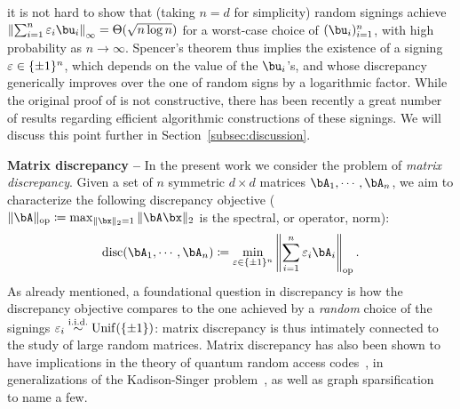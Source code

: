 it is not hard to show that (taking $n = d$ for simplicity) random signings achieve $\left\|\sum_{i=1}^n \eps_i \bu_i\right\|_\infty = \Theta(\sqrt{n \log n})$ for a worst-case choice of $(\bu_i)_{i=1}^n$, 
with high probability as $n \to \infty$. Spencer's theorem thus implies the existence of a signing $\varepsilon \in \{\pm 1\}^n$, 
which depends on the value of the $\bu_i$'s, and whose discrepancy generically improves over the one of random signs by a logarithmic factor.
While the original proof of \cite{spencer1985six} is not constructive, there has been recently a great number of results regarding efficient algorithmic constructions of 
these signings. We will discuss this point further in Section~\ref{subsec:discussion}.

\myskip 
\textbf{Matrix discrepancy --}
In the present work we consider the problem of \emph{matrix discrepancy}. Given a set of $n$ symmetric $d \times d$ matrices $\bA_1, \cdots, \bA_n$, 
we aim to characterize the following discrepancy objective ($\|\bA\|_\op \coloneqq \max_{\|\bx\|_2=1} \|\bA \bx\|_2$ is the spectral, or operator, norm):
\begin{equation}
    \label{eq:def_disc}
    \disc(\bA_1, \cdots, \bA_n) \coloneqq \min_{\eps \in \{\pm 1\}^n} \left\| \sum_{i=1}^n \eps_i \bA_i \right\|_\op.
\end{equation}
As already mentioned, a foundational question in discrepancy is how the discrepancy objective compares to the one achieved by a \emph{random} choice of the 
signings $\varepsilon_i \overset{\mathrm{i.i.d.}}{\sim} \mathrm{Unif}(\{\pm 1\})$: matrix discrepancy is thus intimately connected to the study of large random matrices.
Matrix discrepancy has also
been shown to have implications in the theory of quantum random access codes~\citep{hopkins2022matrix,bansal2023resolving}, 
in generalizations of the Kadison-Singer problem~\citep{marcus2015interlacing,kyng2020four}, as well as 
graph sparsification~\citep{batson2014twice} to name a few.

